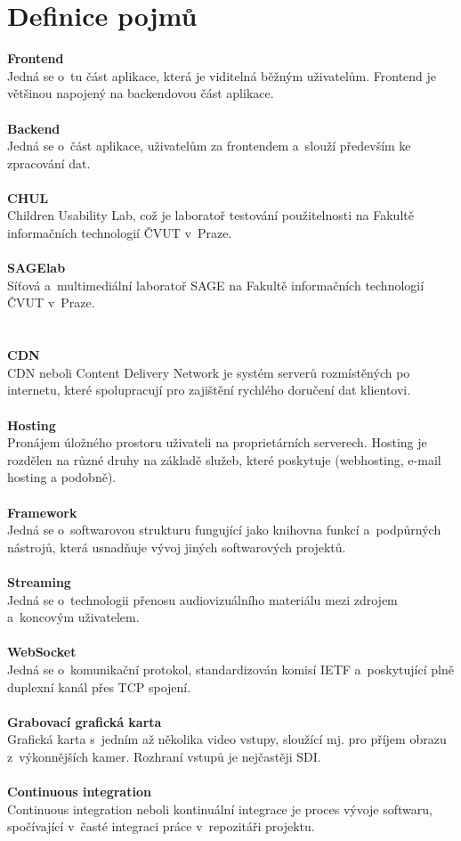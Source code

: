 \documentclass[thesis=M,czech]{FITthesis}[2012/06/26]
\begin{document}
\section{Definice pojmů} \label{sec:analyza_definice_pojmu}
\textbf{Frontend}\\
Jedná se o~tu část aplikace, která je viditelná běžným uživatelům. Frontend je většinou napojený na backendovou část aplikace.\\ \\
\textbf{Backend}\\
Jedná se o~část aplikace, uživatelům  za frontendem a~slouží především ke zpracování dat.\\ \\
\textbf{CHUL}\\
Children Usability Lab, což je laboratoř testování použitelnosti na Fakultě informačních technologií ČVUT v~Praze.\\ \\
\textbf{SAGElab}\\
Síťová a~multimediální laboratoř SAGE na Fakultě informačních technologií ČVUT v~Praze.\\ \\ \\
\textbf{CDN}\\
CDN neboli Content Delivery Network je systém serverů rozmístěných po internetu, které spolupracují pro zajištění rychlého doručení dat klientovi.\\ \\
\textbf{Hosting}\\
Pronájem úložného prostoru uživateli na proprietárních serverech. Hosting je rozdělen na různé druhy na základě služeb, které poskytuje (webhosting, e-mail hosting a podobně).\\ \\
\textbf{Framework}\\
Jedná se o~softwarovou strukturu fungující jako knihovna funkcí a~podpůrných nástrojů, která usnadňuje vývoj jiných softwarových projektů.\\ \\
\textbf{Streaming}\\
 Jedná se o~technologii přenosu audiovizuálního materiálu mezi zdrojem a~koncovým uživatelem.\\ \\
\textbf{WebSocket}\\
Jedná se o~komunikační protokol, standardizován komisí IETF a~poskytující plně duplexní kanál přes TCP spojení. \\ \\
\textbf{Grabovací grafická karta}\\
Grafická karta s~jedním až několika video vstupy, sloužící  mj. pro příjem obrazu z~výkonnějších kamer. Rozhraní vstupů je nejčastěji SDI.\\ \\
\textbf{Continuous integration}\\
Continuous integration neboli kontinuální integrace je proces vývoje softwaru, spočívající v~časté
integraci práce v~repozitáři projektu.\\
\end{document}
